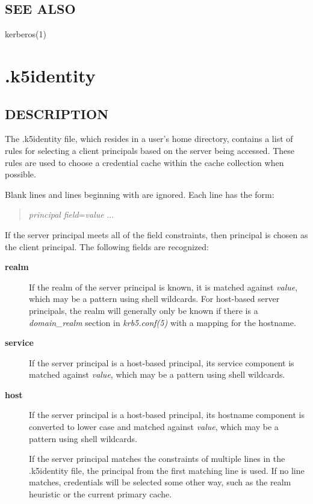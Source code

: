 \documentclass[letterpaper,10pt,english]{sphinxmanual}
\begin{document}
\subsection{SEE ALSO}
\label{user/user_config/k5login:see-also}
kerberos(1)


\section{.k5identity}
\label{user/user_config/k5identity:k5identity-5}\label{user/user_config/k5identity:k5identity}\label{user/user_config/k5identity::doc}

\subsection{DESCRIPTION}
\label{user/user_config/k5identity:description}
The .k5identity file, which resides in a user's home directory,
contains a list of rules for selecting a client principals based on
the server being accessed.  These rules are used to choose a
credential cache within the cache collection when possible.

Blank lines and lines beginning with \code{\#} are ignored.  Each line has
the form:
\begin{quote}

\emph{principal} \emph{field}=\emph{value} ...
\end{quote}

If the server principal meets all of the field constraints, then
principal is chosen as the client principal.  The following fields are
recognized:
\begin{description}
\item[{\textbf{realm}}] \leavevmode
If the realm of the server principal is known, it is matched
against \emph{value}, which may be a pattern using shell wildcards.
For host-based server principals, the realm will generally only be
known if there is a \emph{domain\_realm} section in
\emph{krb5.conf(5)} with a mapping for the hostname.

\item[{\textbf{service}}] \leavevmode
If the server principal is a host-based principal, its service
component is matched against \emph{value}, which may be a pattern using
shell wildcards.

\item[{\textbf{host}}] \leavevmode
If the server principal is a host-based principal, its hostname
component is converted to lower case and matched against \emph{value},
which may be a pattern using shell wildcards.

If the server principal matches the constraints of multiple lines
in the .k5identity file, the principal from the first matching
line is used.  If no line matches, credentials will be selected
some other way, such as the realm heuristic or the current primary
cache.

\end{description}
\end{document}
